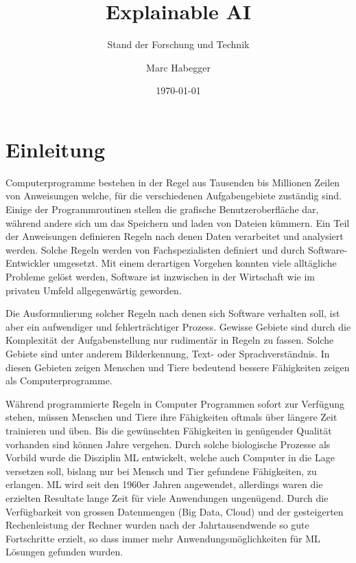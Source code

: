 \documentclass[
  12pt, %
  a4paper, %
  oneside, %
  openany, 
  numbers=noenddot, %
  BCOR=5mm, %
  parskip=half*, %
  thesis, %
]{bfhbook}
\author{Marc Habegger}
\title{Explainable AI}
\subtitle{Stand der Forschung und Technik}
\date{\today} %
\begin{document}
                         
\maketitle

\tableofcontents
\sloppy
\mainmatter %
\raggedright
\chapter{Einleitung}
Computerprogramme bestehen in der Regel aus Tausenden bis Millionen Zeilen von Anweisungen welche, für die verschiedenen Aufgabengebiete zuständig sind. Einige der Programmroutinen stellen die grafische Benutzeroberfläche dar, während andere sich um das Speichern und laden von Dateien kümmern. Ein Teil der Anweisungen definieren Regeln nach denen Daten verarbeitet und analysiert werden. Solche Regeln werden von Fachspezialisten definiert und durch Software-Entwickler umgesetzt. Mit einem derartigen Vorgehen konnten viele alltägliche Probleme gelöst werden, Software ist inzwischen in der Wirtschaft wie im privaten Umfeld allgegenwärtig geworden. 

Die Ausformulierung solcher Regeln nach denen sich Software verhalten soll, ist aber ein aufwendiger und fehlerträchtiger Prozess. Gewisse Gebiete sind durch die Komplexität der Aufgabenstellung nur rudimentär in Regeln zu fassen. Solche Gebiete sind unter anderem Bilderkennung, Text- oder Sprachverständnis. In diesen Gebieten zeigen Menschen und Tiere bedeutend bessere Fähigkeiten zeigen als Computerprogramme. 

Während programmierte Regeln in Computer Programmen sofort zur Verfügung stehen, müssen Menschen und Tiere ihre Fähigkeiten oftmals über längere Zeit trainieren und üben. Bis die gewünschten Fähigkeiten in genügender Qualität vorhanden sind können Jahre vergehen. Durch solche biologische Prozesse als Vorbild wurde die Disziplin \gls{ML} entwickelt, welche auch Computer in die Lage versetzen soll, bislang nur bei Mensch und Tier gefundene Fähigkeiten, zu erlangen.
\gls{ML} wird seit den 1960er Jahren angewendet, allerdings waren die erzielten Resultate lange Zeit für viele Anwendungen ungenügend. Durch die Verfügbarkeit von grossen Datenmengen (Big Data, Cloud) und der gesteigerten Rechenleistung der Rechner wurden nach der Jahrtausendwende so gute Fortschritte erzielt, so dass immer mehr Anwendungsmöglichkeiten für \gls{ML} Lösungen gefunden wurden. 
\end{document}
